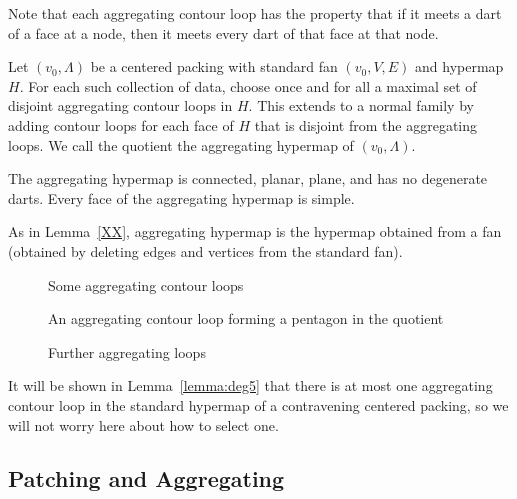 Note that each aggregating contour loop has the property that
if it meets a dart of a face at a node, then it meets every dart
of that face at that node.

\begin{definition}  Let $(v_0,\Lambda)$ be a centered packing with
standard fan $(v_0,V,E)$ and hypermap $H$.  For
each such collection of data, choose once and for all
a maximal set of disjoint aggregating
contour loops in $H$.  This extends to a normal family by adding
contour loops for each face of $H$ that is disjoint from the aggregating
loops.    We call the quotient the aggregating hypermap of $(v_0,\Lambda)$.
\end{definition}

\begin{lemma} The aggregating hypermap is connected, planar, plane,
and has no degenerate darts.   Every face of the aggregating hypermap
is simple. 
\end{lemma}

As in Lemma~\ref{XX}, aggregating hypermap is the hypermap
obtained from a fan (obtained by deleting edges and
vertices from the standard fan).

\begin{figure}[htb]
  \centering
  \caption{Some aggregating contour loops} %
  \label{fig:agg}
\end{figure}

\begin{figure}[htb]
  \centering
  \caption{An aggregating contour loop forming a pentagon in the quotient}
  \label{fig:tri-pent}
\end{figure}

\begin{figure}[htb]
  \centering
  \caption{Further aggregating loops}
  \label{fig:degree6}
\end{figure}



It will be shown in
Lemma~\ref{lemma:deg5} that there is at most one aggregating
contour loop in the standard hypermap of a contravening centered packing,
so we will not worry here about how to select one.




\subsection{Patching and Aggregating}

